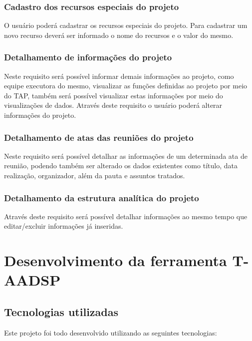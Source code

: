 \documentclass{acm_proc_article-sp}
\begin{document}
\subsubsection{Cadastro dos recursos especiais do projeto}
O usuário poderá cadastrar os recursos especiais do projeto. Para cadastrar um novo recurso deverá ser informado o nome do recursos e o valor do mesmo.

\subsubsection{Detalhamento de informações do projeto}
Neste requisito será possível informar demais informações ao projeto, como equipe executora do mesmo, visualizar as funções definidas ao projeto por meio do TAP, também será possível visualizar estas informações por meio do visualizações de dados. Através deste requisito o usuário poderá alterar informações do projeto. 

\subsubsection{Detalhamento de atas das reuniões do projeto}
Neste requisito será possível detalhar as informações de um determinada ata de reunião, podendo também ser alterado os dados existentes como título, data realização, organizador, além da pauta e assuntos tratados.

\subsubsection{Detalhamento da estrutura analítica do projeto}
Através deste requisito será possível detalhar informações ao mesmo tempo que editar/excluir informações já inseridas.

\section{Desenvolvimento da ferramenta T-AADSP}
\subsection{Tecnologias utilizadas}
Este projeto foi todo desenvolvido utilizando as seguintes tecnologias:
\end{document}
